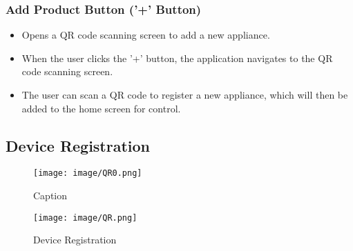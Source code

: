 \documentclass[conference]{IEEEtran}
\begin{document}
\subsubsection{Add Product Button ('+' Button)}
\begin{itemize}
    \item Opens a QR code scanning screen to add a new appliance.\\
    \item When the user clicks the '+' button, the application navigates to the QR code scanning screen.\\
    \item The user can scan a QR code to register a new appliance, which will then be added to the home screen for control.\\
\end{itemize}

\subsection{Device Registration}

\begin{figure}[h!]
    \centering
    \texttt{[image: image/QR0.png]}
    \caption{Caption}
    \label{fig:enter-label}
\end{figure}
\begin{figure}[h!]
    \centering
    \texttt{[image: image/QR.png]}
    \caption{Device Registration}
    \label{fig:enter-label}
\end{figure}
\end{document}
